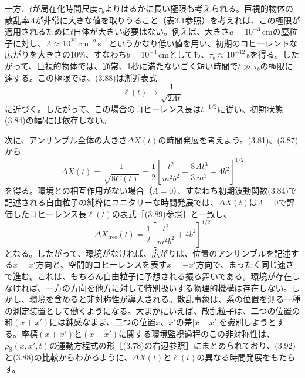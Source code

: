 \hypertarget{srcpage:144}{}\label{srcpage:144}
一方、$t$が局在化時間尺度$\tau_b$よりはるかに長い極限も考えられる。巨視的物体の散乱率$\Lambda$が非常に大きな値を取りうること（表3.1参照）を考えれば、この極限が適用されるために$t$自体が大きい必要はない。例えば、大きさ$a=10^{-3}\,\mathrm{cm}$の塵粒子に対し、$\Lambda\approx10^{20}\,\mathrm{cm}^{-2}\,\mathrm s^{-1}$というかなり低い値を用い、初期のコヒーレントな広がりを大きさの10\%、すなわち$b=10^{-4}\,\mathrm{cm}$としても、$\tau_b\approx10^{-12}\,\mathrm s$を得る。したがって、巨視的物体では、通常、1秒に満たないごく短い時間で$t\gg\tau_b$の極限に達する。この極限では、(3.88)は漸近表式
\begin{equation}
\ell(t)\longrightarrow\frac{1}{\sqrt{2\Lambda t}}
\tag{3.91}
\end{equation}
に近づく。したがって、この場合のコヒーレンス長は$t^{-1/2}$に従い、初期状態(3.84)の幅$b$には依存しない。

次に、アンサンブル全体の大きさ$\Delta X(t)$の時間発展を考えよう。(3.81)、(3.87)から
\begin{equation}
\Delta X(t)=\frac{1}{\sqrt{8C(t)}}=\frac12\left[\frac{t^2}{m^2b^2}+\frac83\frac{\Lambda t^3}{m^3}+4b^2\right]^{1/2}
\tag{3.92}
\end{equation}
を得る。環境との相互作用がない場合（$\Lambda=0$）、すなわち初期波動関数(3.84)で記述される自由粒子の純粋にユニタリーな時間発展では、$\Delta X(t)$は$\Lambda=0$で評価したコヒーレンス長$\ell(t)$の表式［(3.89)参照］と一致し、
\begin{equation}
\Delta X_{\mathrm{free}}(t)=\frac12\left[\frac{t^2}{m^2b^2}+4b^2\right]^{1/2}
\tag{3.93}
\end{equation}
となる。したがって、環境がなければ、広がりは、位置のアンサンブルを記述する$x=x'$方向と、空間的コヒーレンスを表す$x=-x'$方向で、まったく同じ速さで進む。これは、もちろん自由粒子に予想される振る舞いである。環境が存在しなければ、一方の方向を他方に対して特別扱いする物理的機構は存在しない。しかし、環境を含めると非対称性が導入される。散乱事象は、系の位置を測る一種の測定装置として働くようになる。大まかにいえば、散乱粒子は、二つの位置の和$(x+x')$には鈍感なまま、二つの位置$x$、$x'$の差$|x-x'|$を識別しようとする。座標$(x+x')$と$(x-x')$に関する環境監視過程のこの非対称性は、$\rho_{\mathrm S}(x,x',t)$の運動方程式の形［(3.78)の右辺参照］にまとめられており、(3.92)と(3.88)の比較からわかるように、$\Delta X(t)$と$\ell(t)$の異なる時間発展をもたらす。

